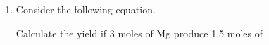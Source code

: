 \documentclass[main.tex]{subfiles}
\begin{document}
\begin{fullwidth}
\begin{multicols*}{2}
\begin{enumerate}
\item  Consider the following equation. 
	\begin{center}\end{center}
Calculate the yield if 3 moles of Mg produce 1.5 moles of 
 \begin{enumerate}[label=(\alph*)]\vspace{-0.5cm}
\end{enumerate}\vspace{-0.5cm}


\end{enumerate}
\end{multicols*}
\end{fullwidth}
\end{document}
